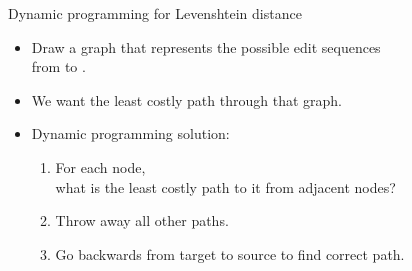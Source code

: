 \documentclass[professionalfonts, xcolor={usenames,svgnames,x11names,table}]{beamer}
\begin{document}
\begin{frame}{Dynamic programming for Levenshtein distance}
    \begin{itemize}
        \item Draw a graph that represents the possible edit sequences\\
              from  to .
        \item We want the least costly path through that graph.
        \item Dynamic programming solution:
            \begin{enumerate}
                \item For each node,\\
                      what is the least costly path to it from adjacent nodes?
                \item Throw away all other paths.
                \item Go backwards from target to source to find correct path.
            \end{enumerate}
    \end{itemize}
\end{frame}
\end{document}
